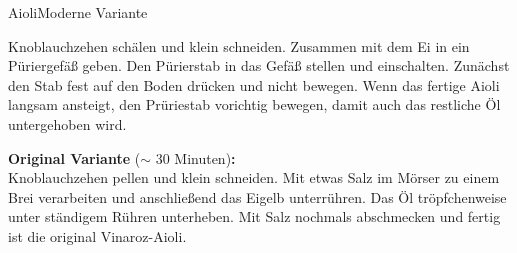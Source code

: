 \begin{recipe}{Aioli}{Moderne Variante}\label{Aioli}
  \inglist

  \steps

  Knoblauchzehen schälen und klein schneiden. Zusammen mit dem Ei in ein
  Püriergefäß geben. Den Pürierstab in das Gefäß stellen und einschalten.
  Zunächst den Stab fest auf den Boden drücken und nicht bewegen. Wenn das
  fertige Aioli langsam ansteigt, den Prüriestab vorichtig bewegen, damit
  auch das restliche Öl untergehoben wird.
  
  \textbf{Original Variante }($\sim$ 30 Minuten)\textbf{:} \\
  Knoblauchzehen pellen und klein schneiden. Mit etwas Salz im Mörser zu
  einem Brei verarbeiten und anschließend das Eigelb unterrühren. Das Öl
  tröpfchenweise unter ständigem Rühren unterheben. Mit Salz nochmals
  abschmecken und fertig ist die original Vinaroz-Aioli.

\end{recipe}
